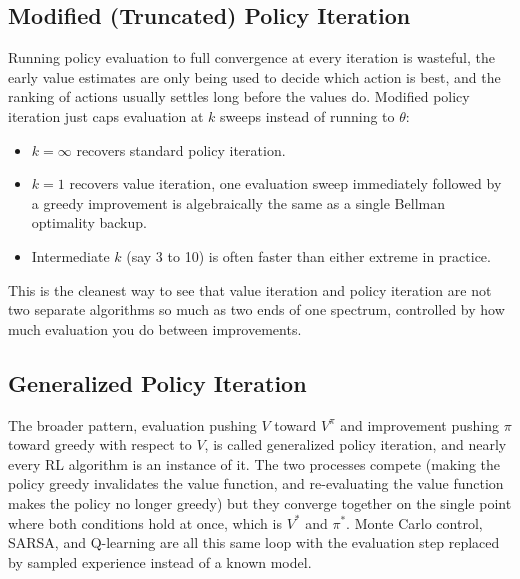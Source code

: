 \documentclass[conference]{IEEEtran}
\begin{document}
\subsection*{Modified (Truncated) Policy Iteration}
Running policy evaluation to full convergence at every iteration is wasteful, the early value estimates are only being used to decide which action is best, and the ranking of actions usually settles long before the values do. Modified policy iteration just caps evaluation at $k$ sweeps instead of running to $\theta$:
\begin{itemize}
    \item $k = \infty$ recovers standard policy iteration.
    \item $k = 1$ recovers value iteration, one evaluation sweep immediately followed by a greedy improvement is algebraically the same as a single Bellman optimality backup.
    \item Intermediate $k$ (say 3 to 10) is often faster than either extreme in practice.
\end{itemize}
This is the cleanest way to see that value iteration and policy iteration are not two separate algorithms so much as two ends of one spectrum, controlled by how much evaluation you do between improvements.

\subsection*{Generalized Policy Iteration}
The broader pattern, evaluation pushing $V$ toward $V^\pi$ and improvement pushing $\pi$ toward greedy with respect to $V$, is called generalized policy iteration, and nearly every RL algorithm is an instance of it. The two processes compete (making the policy greedy invalidates the value function, and re-evaluating the value function makes the policy no longer greedy) but they converge together on the single point where both conditions hold at once, which is $V^*$ and $\pi^*$. Monte Carlo control, SARSA, and Q-learning are all this same loop with the evaluation step replaced by sampled experience instead of a known model.
\end{document}
